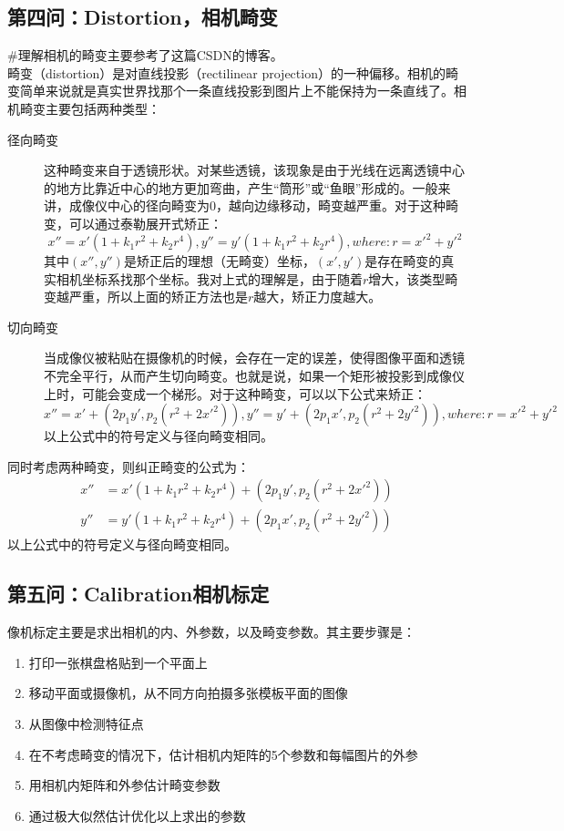 \documentclass[UTF8]{ctexart}
\begin{document}
\subsection{第四问：Distortion，相机畸变}
\#理解相机的畸变主要参考了这篇CSDN的博客\cite{CSDNJessicajiel18830}。\\
畸变（distortion）是对直线投影（rectilinear projection）的一种偏移。相机的畸变简单来说就是真实世界找那个一条直线投影到图片上不能保持为一条直线了。相机畸变主要包括两种类型：
\begin{description}
  \item[径向畸变] 这种畸变来自于透镜形状。对某些透镜，该现象是由于光线在远离透镜中心的地方比靠近中心的地方更加弯曲，产生“筒形”或“鱼眼”形成的。一般来讲，成像仪中心的径向畸变为0，越向边缘移动，畸变越严重。对于这种畸变，可以通过泰勒展开式矫正：
  $$
  x''=x'(1+k_1r^2+k_2r^4),
  y''=y'(1+k_1r^2+k_2r^4),
  where:r=x'^2+y'^2
  $$
  其中$(x'',y'')$是矫正后的理想（无畸变）坐标，$(x',y')$是存在畸变的真实相机坐标系找那个坐标。我对上式的理解是，由于随着$r$增大，该类型畸变越严重，所以上面的矫正方法也是$r$越大，矫正力度越大。
  \item[切向畸变] 当成像仪被粘贴在摄像机的时候，会存在一定的误差，使得图像平面和透镜不完全平行，从而产生切向畸变。也就是说，如果一个矩形被投影到成像仪上时，可能会变成一个梯形。对于这种畸变，可以以下公式来矫正：
  $$
  x''=x'+(2p_1y',p_2(r^2+2x'^2)),
  y''=y'+(2p_1x',p_2(r^2+2y'^2)),
  where:r=x'^2+y'^2
  $$
  以上公式中的符号定义与径向畸变相同。
\end{description}
同时考虑两种畸变，则纠正畸变的公式为：
\begin{align}
  x''&=x'(1+k_1r^2+k_2r^4)+(2p_1y',p_2(r^2+2x'^2))\\
  y''&=y'(1+k_1r^2+k_2r^4)+(2p_1x',p_2(r^2+2y'^2))
\end{align}
以上公式中的符号定义与径向畸变相同。
\subsection{第五问：Calibration相机标定}
像机标定主要是求出相机的内、外参数，以及畸变参数。其主要步骤是\cite{zhang2000flexible}：
\begin{enumerate}
  \item 打印一张棋盘格贴到一个平面上
  \item 移动平面或摄像机，从不同方向拍摄多张模板平面的图像
  \item 从图像中检测特征点
  \item 在不考虑畸变的情况下，估计相机内矩阵的5个参数和每幅图片的外参
  \item 用相机内矩阵和外参估计畸变参数
  \item 通过极大似然估计优化以上求出的参数
\end{enumerate}
\end{document}
